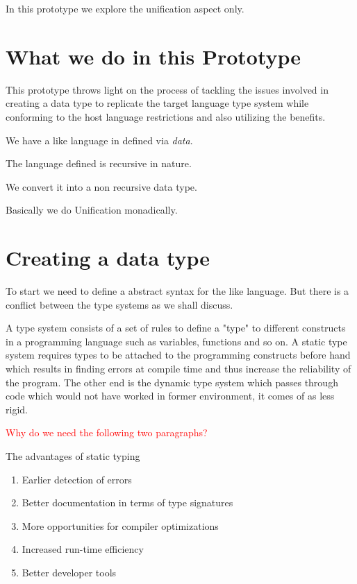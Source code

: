 \documentclass[thesis-solanki.tex]{subfiles}
\begin{document}
In this prototype we explore the unification aspect only.

\section{What we do in this Prototype}
This prototype throws light on the process of tackling the issues involved in creating
a data type to replicate the target language type system while conforming to the host language restrictions and also utilizing the
benefits.


We have a  like language in  defined via \textit{data}.

The language defined is recursive in nature.

We convert it into a non recursive data type.


Basically we do Unification monadically.


\section{Creating a data type}

To start we need to define a abstract syntax for the  like language. But there is a conflict between the type systems as
we shall discuss.


A type system consists of a set of rules to define a "type" to different constructs in a programming language such as variables, functions
and so on. A static type system requires types to be attached to the programming constructs before hand which results in finding errors at
compile time and thus increase the reliability of the program. The other end is the dynamic type system which passes through code which
would not have worked in former environment, it comes of as less rigid.

\textcolor{red}{Why do we need the following two paragraphs?}

The advantages of static typing \cite{meijer2004static}
\begin{enumerate}
\item Earlier detection of errors
\item Better documentation in terms of type signatures
\item More opportunities for compiler optimizations
\item Increased run-time efficiency
\item Better developer tools
\end{enumerate}
\end{document}
